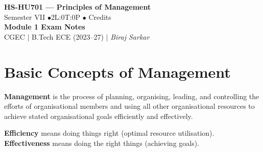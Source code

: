 \documentclass[12pt,a4paper]{article}
\begin{document}

\begin{center}
  {\LARGE\bfseries\color{myred} HS-HU701 --- Principles of Management}\\[5pt]
  {\normalsize\color{mydark} Semester VII \quad$\bullet$\quad 2L:0T:0P \quad$\bullet$ Credits}\\[3pt]
  {\normalsize\color{myteal}\textbf{Module 1 Exam Notes}}\\[3pt]
  {\small\color{mydark} CGEC \;$|$\; B.Tech ECE (2023--27) \;$|$\; \textit{Biraj Sarkar}}
\end{center}
\vspace{2pt}
\noindent{\color{myred}\rule{\linewidth}{1.5pt}}
\vspace{2pt}

\hypersetup{linkcolor=mydark}
\tableofcontents
\hypersetup{linkcolor=myteal}
\newpage

\section{Basic Concepts of Management}

\begin{tcolorbox}[defbox, title={\textbf{Definition of Management}}]
\textbf{Management} is the process of planning, organising, leading, and controlling the efforts of organisational members and using all other organisational resources to achieve stated organisational goals efficiently and effectively.
\par\vspace{3pt}
\textbf{Efficiency} means doing things right (optimal resource utilisation). \textbf{Effectiveness} means doing the right things (achieving goals).
\end{tcolorbox}
\end{document}
